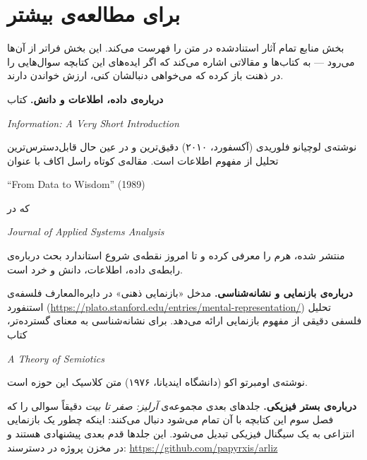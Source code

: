 \chapter*{برای مطالعه‌ی بیشتر}

بخش منابع تمام آثار استناد‌شده در متن را فهرست می‌کند. این بخش فراتر از آن‌ها
می‌رود --- به کتاب‌ها و مقالاتی اشاره می‌کند که اگر ایده‌های این کتابچه
سوال‌هایی را در ذهنت باز کرده که می‌خواهی دنبالشان کنی، ارزش خواندن دارند.

\medskip

\textbf{درباره‌ی داده، اطلاعات و دانش.}
کتاب
\begin{latin}\textit{Information: A Very Short Introduction}\end{latin}
نوشته‌ی لوچیانو فلوریدی (آکسفورد، ۲۰۱۰) دقیق‌ترین و در عین حال
قابل‌دسترس‌ترین تحلیل از مفهوم اطلاعات است.
مقاله‌ی کوتاه راسل اکاف با عنوان
\begin{latin}``From Data to Wisdom'' (1989)\end{latin}
که در
\begin{latin}\textit{Journal of Applied Systems Analysis}\end{latin}
منتشر شده، هرم  را معرفی کرده و تا امروز نقطه‌ی شروع استاندارد
بحث درباره‌ی رابطه‌ی داده، اطلاعات، دانش و خرد است.

\medskip

\textbf{درباره‌ی بازنمایی و نشانه‌شناسی.}
مدخل «بازنمایی ذهنی» در دایره‌المعارف فلسفه‌ی استنفورد
(\url{https://plato.stanford.edu/entries/mental-representation/})
تحلیل فلسفی دقیقی از مفهوم بازنمایی ارائه می‌دهد.
برای نشانه‌شناسی به معنای گسترده‌تر، کتاب
\begin{latin}\textit{A Theory of Semiotics}\end{latin}
نوشته‌ی اومبرتو اکو (دانشگاه ایندیانا، ۱۹۷۶) متن کلاسیک این حوزه است.

\medskip

\textbf{درباره‌ی بستر فیزیکی.}
جلدهای بعدی مجموعه‌ی \textit{آرلیز: صفر تا بیت} دقیقاً سوالی را که
فصل سوم این کتابچه با آن تمام می‌شود دنبال می‌کنند: اینکه چطور یک
بازنمایی انتزاعی به یک سیگنال فیزیکی تبدیل می‌شود. این جلدها قدم بعدی
پیشنهادی هستند و در مخزن پروژه در دسترسند:
\url{https://github.com/papyrxis/arliz}